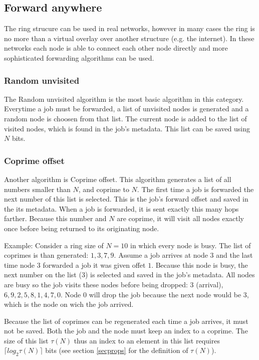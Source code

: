 \documentclass[10pt,a4paper]{article}
\begin{document}
\subsection{Forward anywhere}
The ring strucure can be used in real networks, however in many cases the ring is no more than a virtual overlay over another structure (e.g. the internet). In these networks each node is able to connect each other node directly and more sophisticated forwarding algorithms can be used.

\subsubsection*{Random unvisited}
The Random unvisited algorithm is the most basic algorithm in this category. Everytime a job must be forwarded, a list of unvisited nodes is generated and a random node is choosen from that list. The current node is added to the list of visited nodes, which is found in the job's metadata. This list can be saved using $N$ bits.

\subsubsection*{Coprime offset}
Another algorithm is Coprime offset. This algorithm generates a list of all numbers smaller than $N$, and coprime to $N$. The first time a job is forwarded the next number of this list is selected. This is the job's forward offset and saved in the its metadata. When a job is forwarded, it is sent exactly this many hops farther. Because this number and $N$ are coprime, it will visit all nodes exactly once before being returned to its originating node. 

Example:
Consider a ring size of $N=10$ in which every node is busy. The list of coprimes is than generated: ${1, 3, 7, 9}$. Assume a job arrives at node $3$ and the last time node $3$ forwarded a job it was given offet $1$.
Because this node is busy, the next number on the list ($3$) is selected and saved in the job's metadata. All nodes are busy so the job visits these nodes before being dropped: $3$ (arrival), $6, 9, 2, 5, 8, 1, 4, 7, 0$. Node $0$ will drop the job because the next node would be $3$, which is the node on wich the job arrived.

Because the list of coprimes can be regenerated each time a job arrives, it must not be saved. Both the job and the node must keep an index to a coprime. The size of this list $\tau(N)$ thus an index to an element in this list requires $\lceil log_2 \tau(N) \rceil$ bits (see section \ref{secprops} for the definition of $\tau(N)$).
\end{document}
